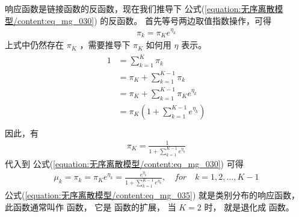 \documentclass[letterpaper,10pt,english]{sphinxmanual}
\begin{document}
响应函数是链接函数的反函数，现在我们推导下 公式(\ref{equation:无序离散模型/content:eq_mg_030}) 的反函数。
首先等号两边取值指数操作，可得
\begin{equation}\label{equation:无序离散模型/content:无序离散模型/content:13}
\begin{split}\pi_k = \pi_K e^{\eta_k}\end{split}
\end{equation}
上式中仍然存在 \(\pi_K\) ，需要推导下 \(\pi_K\) 如何用 \(\eta\)
表示。
\begin{align}\label{equation:无序离散模型/content:无序离散模型/content:14}\!\begin{aligned}
1 &= \sum_{k=1}^K \pi_k\\
&= \pi_K + \sum_{k=1}^{K-1} \pi_k\\
&= \pi_K + \sum_{k=1}^{K-1} \pi_K e^{\eta_k}\\
&= \pi_K (1+ \sum_{k=1}^{K-1}  e^{\eta_k})\\
\end{aligned}\end{align}
因此，有
\begin{equation}\label{equation:无序离散模型/content:无序离散模型/content:15}
\begin{split}\pi_K = \frac{1}{ 1+ \sum_{k=1}^{K-1}  e^{\eta_k}}\end{split}
\end{equation}
代入到 公式(\ref{equation:无序离散模型/content:eq_mg_030}) 可得
\begin{equation}\label{equation:无序离散模型/content:eq_mg_035}
\begin{split}\mu_k = \pi_k = \pi_K e^{\eta_k} = \frac{e^{\eta_k}}{ 1+ \sum_{k=1}^{K-1}  e^{\eta_k}}
, \quad for \quad k=1,2,\dots,K-1\end{split}
\end{equation}
公式(\ref{equation:无序离散模型/content:eq_mg_035}) 就是类别分布的响应函数，此函数通常叫作  函数，
它是  函数的扩展，
当 \(K=2\) 时， 就是退化成  函数。
\end{document}
